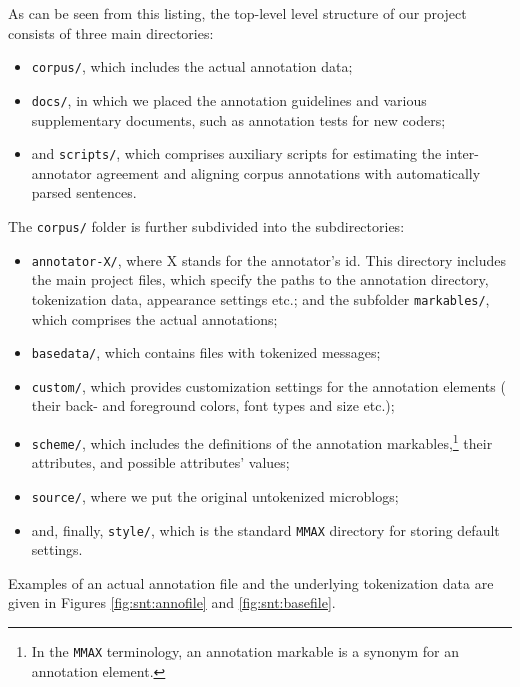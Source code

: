 As can be seen from this listing, the top-level level structure of our
project consists of three main directories:
\begin{itemize}
\item\texttt{corpus/}, which includes the actual annotation data;

\item\texttt{docs/}, in which we placed the annotation guidelines and
  various supplementary documents, such as annotation tests for new
  coders;

\item and \texttt{scripts/}, which comprises auxiliary scripts for
  estimating the inter-annotator agreement and aligning corpus
  annotations with automatically parsed sentences.
\end{itemize}

The \texttt{corpus/} folder is further subdivided into the
subdirectories:

\begin{itemize}
\item\texttt{annotator-X/}, where X stands for the annotator's id.
  This directory includes the main project files, which specify the
  paths to the annotation directory, tokenization data, appearance
  settings etc.; and the subfolder \texttt{markables/}, which
  comprises the actual annotations;

\item\texttt{basedata/}, which contains files with tokenized messages;

\item\texttt{custom/}, which provides customization settings for the
  annotation elements (\eg{} their back- and foreground colors, font
  types and size etc.);

\item\texttt{scheme/}, which includes the definitions of the
  annotation markables,\footnote{In the \texttt{MMAX} terminology, an
    annotation markable is a synonym for an annotation element.}
  their attributes, and possible attributes' values;

\item\texttt{source/}, where we put the original untokenized
  microblogs;

\item and, finally, \texttt{style/}, which is the standard
  \texttt{MMAX} directory for storing default settings.
\end{itemize}

Examples of an actual annotation file and the underlying tokenization
data are given in Figures \ref{fig:snt:annofile} and
\ref{fig:snt:basefile}.

